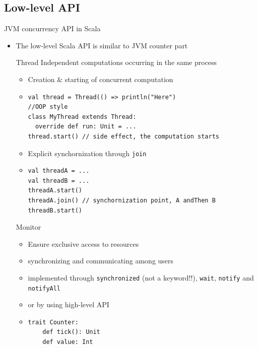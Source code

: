 \documentclass[presentation, 9pt]{beamer}\mode<presentation>{\usetheme{AMSBolognaFC}}
\begin{document}
\subsection{Low-level API}
\begin{frame}{JVM concurrency API in Scala}
	\begin{itemize}
		\item The low-level Scala API is similar to JVM counter part
  	\begin{alertblock}{Thread}
			Independent computations occurring in the same process 
			\begin{itemize}
				\item Creation \& starting of concurrent computation
    		\item[] \begin{tcolorbox}[left=0pt, top=0pt, bottom=0pt]
					\begin{verbatim}
val thread = Thread(() => println("Here")
//OOP style
class MyThread extends Thread:
  override def run: Unit = ...
thread.start() // side effect, the computation starts
					\end{verbatim}
				\end{tcolorbox}

				\item Explicit synchornization through \texttt{join}
				\item[] \begin{tcolorbox}[left=0pt, top=0pt, bottom=0pt]
					\begin{verbatim}
val threadA = ...
val threadB = ...
threadA.start()
threadA.join() // synchornization point, A andThen B
threadB.start()
					\end{verbatim}
				\end{tcolorbox}
			\end{itemize}
		\end{alertblock}
		\begin{alertblock}{Monitor}
			\begin{itemize}
				\item Ensure exclusive access to resources 
				\item synchronizing and communicating among users
    		\item implemented through \texttt{synchronized} (not a keyword!!), \texttt{wait}, \texttt{notify} and \texttt{notifyAll}
      	\item or by using high-level API
    		\item[] \begin{tcolorbox}[left=0pt, top=0pt, bottom=0pt]
					\begin{verbatim}
trait Counter:
	def tick(): Unit
	def value: Int


\end{verbatim}
\end{tcolorbox}
\end{itemize}
\end{alertblock}
\end{itemize}
\end{frame}
\end{document}

